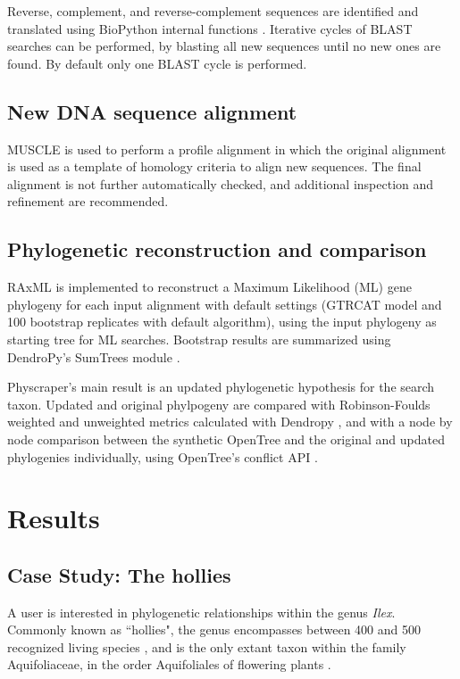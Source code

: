 \documentclass{bmcart}
\begin{document}
Reverse, complement, and reverse-complement sequences are identified and translated
using BioPython internal functions \cite{cock2009biopython}.
Iterative cycles of BLAST searches can be performed, by blasting all new sequences
until no new ones are found. By default only one BLAST cycle is performed.

\subsection*{New DNA sequence alignment}

MUSCLE \cite{edgar2004muscle} is used to perform a profile alignment in which the
original alignment is used as a template of homology criteria to align new sequences.
The final alignment is not further automatically checked, and additional inspection
and refinement are recommended.

\subsection*{Phylogenetic reconstruction and comparison}

RAxML \cite{stamatakis2014raxml} is implemented to reconstruct a Maximum Likelihood
(ML) gene phylogeny for each input alignment with default settings (GTRCAT model and
100 bootstrap replicates with default algorithm), using the input phylogeny as starting
tree for ML searches.
Bootstrap results are summarized using DendroPy's SumTrees module
\cite{sukumaran2010dendropy}.

Physcraper's main result is an updated phylogenetic hypothesis for the search taxon.
Updated and original phylpogeny are compared with Robinson-Foulds weighted and unweighted
metrics calculated with Dendropy \cite{sukumaran2010dendropy}, and with a node by node
comparison between the synthetic OpenTree and the original and updated phylogenies individually,
using OpenTree's conflict API \cite{redelings2017supertree}.


\section*{Results}
\subsection*{Case Study: The hollies}

A user is interested in phylogenetic relationships within the genus \textit{Ilex}. Commonly
known as ``hollies", the genus encompasses between 400 \cite{gottlieb2005molecular}
and 500 recognized living species \cite{plantlist}, and is
the only extant taxon within the family Aquifoliaceae, in the order Aquifoliales of flowering
plants \cite{chase2016update}.
\end{document}
